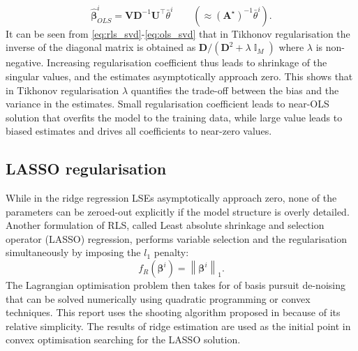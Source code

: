 \documentclass[a4paper,11pt,twoside]{article}
\newcommand{\norm}[1]{\left\lVert#1\right\rVert}
\DeclareMathOperator{\eye}{\mathbb{I}}
\theoremstyle{mytheoremstyle}
\begin{document}
\begin{equation}\label{eq:ols_svd}
\hat{\mathbf{\beta}}^{i}_{OLS} = \mathbf{V}\mathbf{D}^{-1}\mathbf{U}^{\top}\bar{\theta}^i \qquad \left( \approx (\mathbf{A}^{\star})^{-1}\bar{\theta}^i\right).
\end{equation}
It can be seen from \eqref{eq:rls_svd}-\eqref{eq:ols_svd} that in Tikhonov regularisation the inverse of the diagonal matrix is obtained as $\mathbf{D} / (\mathbf{D}^2  + \lambda \eye_M)$ where $\lambda$ is non-negative. Increasing regularisation coefficient thus leads to shrinkage of the singular values, and the estimates asymptotically approach zero. This shows that in Tikhonov regularisation $\lambda$ quantifies the trade-off between the bias and the variance in the estimates. Small regularisation coefficient leads to near-OLS solution that overfits the model to the training data, while large value leads to biased estimates and drives all coefficients to near-zero values.
\subsection{LASSO regularisation}
\par While in the ridge regression LSEs asymptotically approach zero, none of the parameters can be zeroed-out explicitly if the model structure is overly detailed. Another formulation of RLS, called Least absolute shrinkage and selection operator (LASSO) regression, performs variable selection and the regularisation simultaneously by imposing the $l_1$ penalty: 
\begin{equation}
f_{R}(\mathbf{\beta}^i) = \norm{\mathbf{\beta}^i}_{1}.
\end{equation}
The Lagrangian optimisation problem then takes for of basis pursuit de-noising that can be solved numerically using quadratic programming or convex techniques. This report uses the shooting algorithm proposed in \cite{Fu1998} because of its relative simplicity. The results of ridge estimation are used as the initial point in convex optimisation searching for the LASSO solution.
\end{document}
